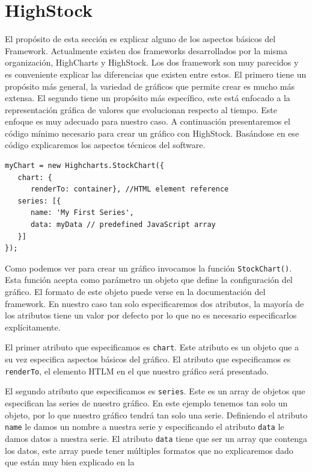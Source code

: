 \section{HighStock}
	El propósito de esta sección es explicar alguno de los aspectos básicos del Framework. Actualmente existen dos frameworks desarrollados por la
	misma organización, HighCharts y HighStock. Los dos framework son muy parecidos y es conveniente explicar las diferencias que existen entre
	estos. El primero tiene un propósito más general, la variedad de gráficos que permite crear es mucho más extensa. El segundo tiene un
	propósito más específico, este está enfocado a la representación gráfica de valores que evolucionan respecto al tiempo. Este enfoque es muy
	adecuado para nuestro caso. A continuación presentaremos el código mínimo necesario para crear un gráfico con HighStock. Basándose en ese
	código explicaremos los aspectos técnicos del software.
	\begin{lstlisting}[style=myJs]
myChart = new Highcharts.StockChart({
   chart: {
      renderTo: container}, //HTML element reference
   series: [{
      name: 'My First Series',
      data: myData // predefined JavaScript array
   }]
});
	\end{lstlisting}
	\par
	Como podemos ver para crear un gráfico invocamos la función \texttt{StockChart()}. Esta función acepta como parámetro un objeto que
	define la configuración del gráfico. El formato de este objeto puede verse en la documentación del framework\cite{HighStockDoc}. En nuestro
	caso tan solo especificaremos dos atributos, la mayoría de los atributos tiene un valor por defecto por lo que no es necesario especificarlos
	explícitamente. 
	\par
	El primer atributo que especificamos es \texttt{chart}. Este atributo es un objeto que a su vez especifica  aspectos básicos del gráfico. El
	atributo que especificamos es \texttt{renderTo}, el elemento HTLM en el que nuestro gráfico será presentado.
	\par
	El segundo atributo que especificamos es \texttt{series}. Este es un array de objetos que especifican las series de nuestro gráfico. En este
	ejemplo tenemos tan solo un objeto, por lo que nuestro gráfico tendrá tan solo una serie.  Definiendo el atributo \texttt{name} le damos un
	nombre a nuestra serie y especificando el atributo \texttt{data} le damos datos a nuestra serie. El atributo \texttt{data} tiene que ser un
	array que contenga los datos, este array puede tener múltiples formatos que no explicaremos dado que están muy bien explicado en la
